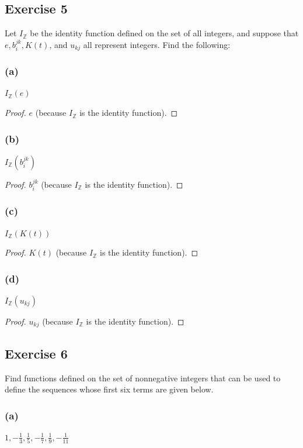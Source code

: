 \documentclass[14pt]{extarticle}
\newcommand{\dps}{\displaystyle}
\newcommand{\Z}{\mathbb{Z}}
\begin{document}
\subsection{Exercise 5}
Let $I_{\Z}$ be the identity function defined on the set of all integers, and suppose that \(e, b_{i}^{jk}, K(t)\), and 
\(u_{kj}\) all represent integers. Find the following:

\subsubsection{(a)}
\(I_{\Z}(e)\)

\begin{proof}
$e$ (because \(I_{\Z}\) is the identity function).
\end{proof}

\subsubsection{(b)}
\(I_{\Z}(b_{i}^{jk})\)

\begin{proof}
$b_{i}^{jk}$ (because \(I_{\Z}\) is the identity function).
\end{proof}

\subsubsection{(c)}
\(I_{\Z}(K(t))\)

\begin{proof}
$K(t)$ (because \(I_{\Z}\) is the identity function).
\end{proof}

\subsubsection{(d)}
\(I_{\Z}(u_{kj})\)

\begin{proof}
$u_{kj}$ (because \(I_{\Z}\) is the identity function).
\end{proof}

\subsection{Exercise 6}
Find functions defined on the set of nonnegative integers that can be used to define the sequences whose first six 
terms are given below.

\subsubsection{(a)}
\(\dps 1, -\frac{1}{3}, \frac{1}{5}, -\frac{1}{7}, \frac{1}{9}, -\frac{1}{11}\)
\end{document}
